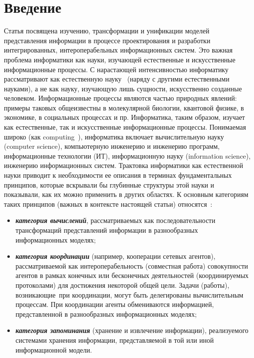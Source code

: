 \begin{multicols}{2}


\label{st\stat}

\section{Введение}

Статья посвящена изучению, трансформации и унификации
моделей представления информации в процессе проектирования и
разработки интегрированных, интероперабельных информационных систем.
Это важная проблема информатики как науки, изучающей естественные
и искусственные информационные процессы. С нарастающей
интенсивностью информатику рассматривают как естественную науку~\cite{De07}
(наряду с другими естественными науками), а не как науку, изучающую
лишь сущности, искусственно созданные человеком. Информационные
процессы являются частью природных явлений: примеры таковых
общеизвестны в молекулярной биологии, квантовой физике, в экономике, в
социальных процессах и пр. Информатика, таким образом, изучает как
естественные, так и искусственные информационные процессы. Понимаемая
широко (как computing~\cite{De03}), информатика включает вычислительную науку
(computer science), компьютерную инженерию и инженерию\linebreak 
программ, информационные технологии (ИТ),
информационную науку (information science),\linebreak  
инженерию информационных систем. Трактовка информатики как
естественной науки приводит к необходимости ее описания в терминах
фундаментальных принципов, которые вскрывали бы глубинные структуры
этой науки и показывали, как их можно применить в других областях. К
основным категориям таких принципов (важных в контексте настоящей
статьи) относятся~\cite{De03}:
\begin{itemize}
\item {\bfseries\textit{категория вычислений}}, рассматриваемых как
последовательности трансформаций пред\-став\-ле\-ний информации в
разнообразных информационных моделях;
\item {\bfseries\textit{категория координации}} (например, кооперации сетевых агентов),
рассматриваемой как ин\-тер\-опе\-ра\-бель\-ность (совместная работа)
совокупности агентов в рамках конечных или бес\-конечных деятельностей 
(координируемых протоколами) для достижения некоторой общей цели. Задачи 
(работы), возникающие~при координации, могут быть делегированы вычислительным 
процессам. При координации агенты обмениваются информацией, 
пред\-став\-лен\-ной в разнообразных информационных моделях;
\item {\bfseries\textit{категория запоминания}} (хранение и извлечение информации),
реализуемого системами хранения информации, представляемой в той или
иной информационной модели.
\end{itemize}



\end{multicols}
